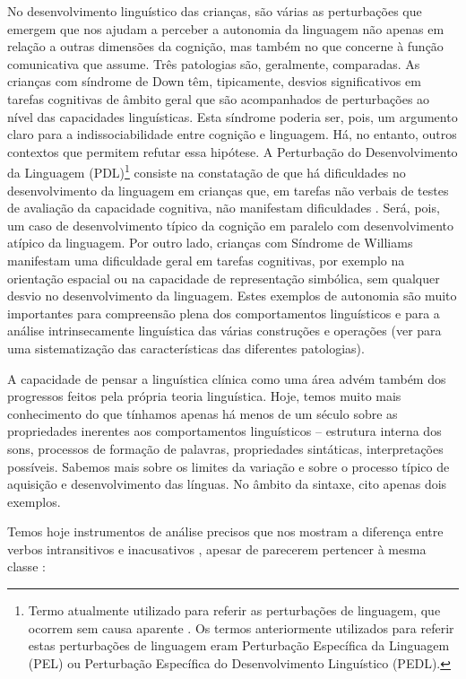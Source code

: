 \documentclass[output=paper,colorlinks,citecolor=brown,booklanguage=portuguese]{langscibook}
\begin{document}
No desenvolvimento linguístico das crianças, são várias as perturbações que emergem que nos ajudam a perceber a autonomia da linguagem não apenas em relação a outras dimensões da cognição, mas também no que concerne à função comunicativa que assume. Três patologias são, geralmente, comparadas. As crianças com síndrome de Down têm, tipicamente, desvios significativos em tarefas cognitivas de âmbito geral que são acompanhados de perturbações ao nível das capacidades linguísticas. Esta síndrome poderia ser, pois, um argumento claro para a indissociabilidade entre cognição e linguagem. Há, no entanto, outros contextos que permitem refutar essa hipótese. A Perturbação do Desenvolvimento da Linguagem (PDL)\footnote{Termo atualmente utilizado para referir as perturbações de linguagem, que ocorrem sem causa aparente \citep{Bishop2017}. Os termos anteriormente utilizados para referir estas perturbações de linguagem eram Perturbação Específica da Linguagem (PEL) ou Perturbação Específica do Desenvolvimento Linguístico (PEDL).} consiste na constatação de que há dificuldades no desenvolvimento da linguagem em crianças que, em tarefas não verbais de testes de avaliação da capacidade cognitiva, não manifestam dificuldades \citep{Leonard1981}. Será, pois, um caso de desenvolvimento típico da cognição em paralelo com desenvolvimento atípico da linguagem. Por outro lado, crianças com Síndrome de Williams manifestam uma dificuldade geral em tarefas cognitivas, por exemplo na orientação espacial ou na capacidade de representação simbólica, sem qualquer desvio no desenvolvimento da linguagem. Estes exemplos de autonomia são muito importantes para compreensão plena dos comportamentos linguísticos e para a análise intrinsecamente linguística das várias construções e operações (ver \citealt{TagerFlusberg2006} para uma sistematização das características das diferentes patologias).

A capacidade de pensar a linguística clínica como uma área advém também dos progressos feitos pela própria teoria linguística. Hoje, temos muito mais conhecimento do que tínhamos apenas há menos de um século sobre as propriedades inerentes aos comportamentos linguísticos – estrutura interna dos sons, processos de formação de palavras, propriedades sintáticas, interpretações possíveis. Sabemos mais sobre os limites da variação e sobre o processo típico de aquisição e desenvolvimento das línguas. No âmbito da sintaxe, cito apenas dois exemplos. 

Temos hoje instrumentos de análise precisos que nos mostram a diferença entre verbos intransitivos  e inacusativos , apesar de parecerem pertencer à mesma classe \citep{Perlmutter1978, Burzio1981}:
\end{document}
